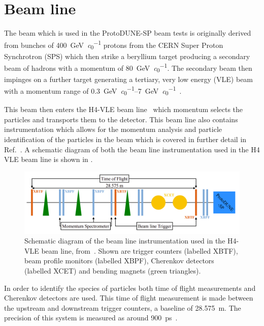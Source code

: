 \section{Beam line}
\label{sec:protodune:beam}

The beam which is used in the ProtoDUNE-SP beam tests is originally derived from bunches of \SI{400}{\GeV\per\clight} protons from the CERN Super Proton Synchrotron (SPS) which then strike a beryllium target producing a secondary beam of hadrons with a momentum of \SI{80}{\GeV\per\clight}.
The secondary beam then impinges on a further target generating a tertiary, very low energy (VLE) beam with a momentum range of \SIrange{0.3}{7}{\GeV\per\clight}~\cite{protodunePerformance}.

This beam then enters the H4-VLE beam line~\cite{h4vle} which momentum selects the particles and transports them to the detector.
This beam line also contains instrumentation which allows for the momentum analysis and particle identification of the particles in the beam which is covered in further detail in Ref.~\cite{boothBeamLineInstr}.
A schematic diagram of both the beam line instrumentation used in the H4 VLE beam line is shown in .

\begin{figure}[h]
	\centering
	\includegraphics[width=\linewidth]{files/figures/protodune_detector/h4vleDiag}
	\caption[Schematic diagram of the beam line instrumentation used in the H4-VLE beam line]{Schematic diagram of the beam line instrumentation used in the H4-VLE beam line, from~\cite{protodunePerformance}. Shown are trigger counters (labelled XBTF), beam profile monitors (labelled XBPF), Cherenkov detectors (labelled XCET) and bending magnets (green triangles).}
	\label{fig:h4vleDiag}
\end{figure}

In order to identify the species of particles both time of flight measurements and Cherenkov detectors are used.
This time of flight measurement is made between the upstream and downstream trigger counters, a baseline of \SI{28.575}{\m}.
The precision of this system is measured as around \SI{900}{\pico\second}~\cite{boothBeamLineInstr}.

